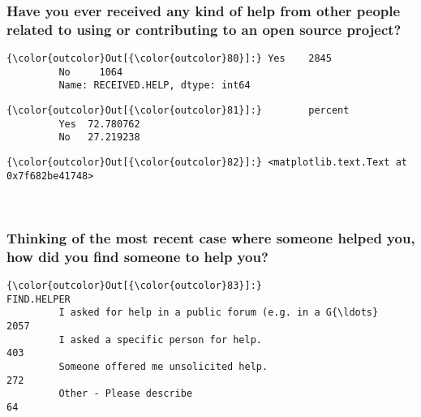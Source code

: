 \documentclass[11pt]{article}
\begin{document}
    \subsubsection{Have you ever received any kind of help from other people
related to using or contributing to an open source
project?}\label{have-you-ever-received-any-kind-of-help-from-other-people-related-to-using-or-contributing-to-an-open-source-project}


            \begin{Verbatim}[commandchars=\\\{\}]
{\color{outcolor}Out[{\color{outcolor}80}]:} Yes    2845
         No     1064
         Name: RECEIVED.HELP, dtype: int64
\end{Verbatim}
        

            \begin{Verbatim}[commandchars=\\\{\}]
{\color{outcolor}Out[{\color{outcolor}81}]:}        percent
         Yes  72.780762
         No   27.219238
\end{Verbatim}
        

            \begin{Verbatim}[commandchars=\\\{\}]
{\color{outcolor}Out[{\color{outcolor}82}]:} <matplotlib.text.Text at 0x7f682be41748>
\end{Verbatim}
        
    \begin{center}
    \end{center}
    { \hspace*{\fill} \\}
    
    \subsubsection{Thinking of the most recent case where someone helped
you, how did you find someone to help
you?}\label{thinking-of-the-most-recent-case-where-someone-helped-you-how-did-you-find-someone-to-help-you}


            \begin{Verbatim}[commandchars=\\\{\}]
{\color{outcolor}Out[{\color{outcolor}83}]:}                                                     FIND.HELPER
         I asked for help in a public forum (e.g. in a G{\ldots}         2057
         I asked a specific person for help.                         403
         Someone offered me unsolicited help.                        272
         Other - Please describe                                      64
\end{Verbatim}
        
\end{document}

